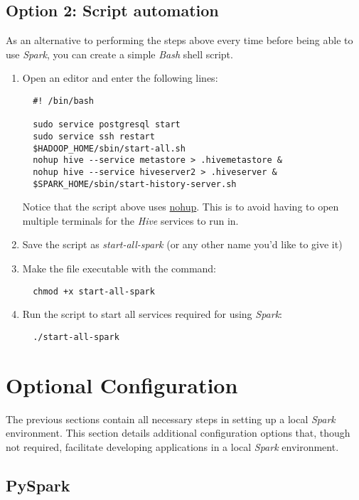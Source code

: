\documentclass{article}
\begin{document}
  \subsection{Option 2: Script automation}
  As an alternative to performing the steps above every time before being able to use \emph{Spark},
  you can create a simple \emph{Bash} shell script.
  \begin{enumerate}
  \item Open an editor and enter the following lines:
  \begin{verbatim}
  #! /bin/bash

  sudo service postgresql start
  sudo service ssh restart
  $HADOOP_HOME/sbin/start-all.sh
  nohup hive --service metastore > .hivemetastore &
  nohup hive --service hiveserver2 > .hiveserver &
  $SPARK_HOME/sbin/start-history-server.sh
  \end{verbatim}
  Notice that the script above uses \href{https://en.wikipedia.org/wiki/Nohup}{nohup}. This is to
  avoid having to open multiple terminals for the \emph{Hive} services to run in.
  
  \item Save the script as \emph{start-all-spark} (or any other name you'd like to give it)

  \item Make the file executable with the command:
  \begin{verbatim}
  chmod +x start-all-spark
  \end{verbatim}

  \item Run the script to start all services required for using \emph{Spark}:
  \begin{verbatim}
  ./start-all-spark
  \end{verbatim}
\end{enumerate}

\newpage
\section{Optional Configuration}
The previous sections contain all necessary steps in setting up a local \emph{Spark} environment.
This section details additional configuration options that, though not required, facilitate
developing applications in a local \emph{Spark} environment.

  \subsection{PySpark}
\end{document}
